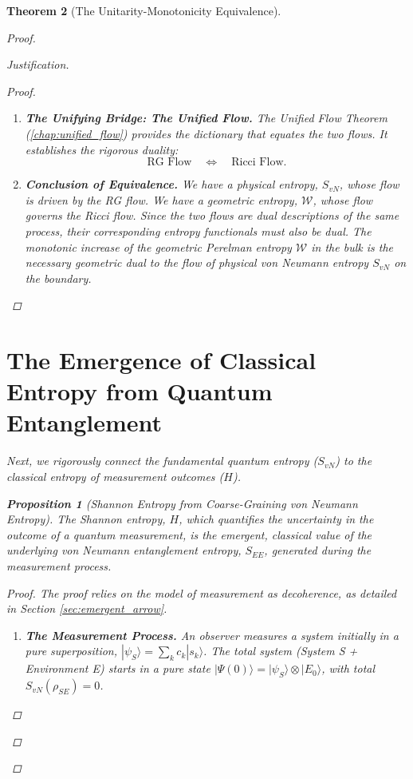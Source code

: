 \documentclass[11pt, letterpaper]{report}
\theoremstyle{plain} %
\newtheorem{theorem}{Theorem}[chapter]
\newtheorem{proposition}[theorem]{Proposition}
\theoremstyle{definition} %
\theoremstyle{remark} %
\begin{document}
\begin{theorem}[The Unitarity-Monotonicity Equivalence]
\begin{proof}
\begin{proof}[Justification]
\begin{proof}
\begin{enumerate}
    \item \textbf{The Unifying Bridge: The Unified Flow.} The Unified Flow Theorem (\cref{chap:unified_flow}) provides the dictionary that equates the two flows. It establishes the rigorous duality:
    \begin{equation}
        \text{RG Flow} \quad \Longleftrightarrow \quad \text{Ricci Flow}.
    \end{equation}

    \item \textbf{Conclusion of Equivalence.} We have a physical entropy, $S_{vN}$, whose flow is driven by the RG flow. We have a geometric entropy, $\mathcal{W}$, whose flow governs the Ricci flow. Since the two flows are dual descriptions of the same process, their corresponding entropy functionals must also be dual. The monotonic increase of the geometric Perelman entropy $\mathcal{W}$ in the bulk is the necessary geometric dual to the flow of physical von Neumann entropy $S_{vN}$ on the boundary.
\end{enumerate}
\end{proof}

\section{The Emergence of Classical Entropy from Quantum Entanglement}
\label{app:svn_shannon_emergence}

Next, we rigorously connect the fundamental quantum entropy ($S_{vN}$) to the classical entropy of measurement outcomes ($H$).

\begin{proposition}[Shannon Entropy from Coarse-Graining von Neumann Entropy]
\label{prop:shannon_from_vn}
The Shannon entropy, $H$, which quantifies the uncertainty in the outcome of a quantum measurement, is the emergent, classical value of the underlying von Neumann entanglement entropy, $S_{EE}$, generated during the measurement process.
\end{proposition}
\begin{proof}
The proof relies on the model of measurement as decoherence, as detailed in Section \ref{sec:emergent_arrow}.
\begin{enumerate}
    \item \textbf{The Measurement Process.} An observer measures a system initially in a pure superposition, $|\psi_S\rangle = \sum_k c_k |s_k\rangle$. The total system (System S + Environment E) starts in a pure state $|\Psi(0)\rangle = |\psi_S\rangle \otimes |E_0\rangle$, with total $S_{vN}(\rho_{SE})=0$.


\end{enumerate}
\end{proof}
\end{proof}
\end{proof}
\end{theorem}
\end{document}
